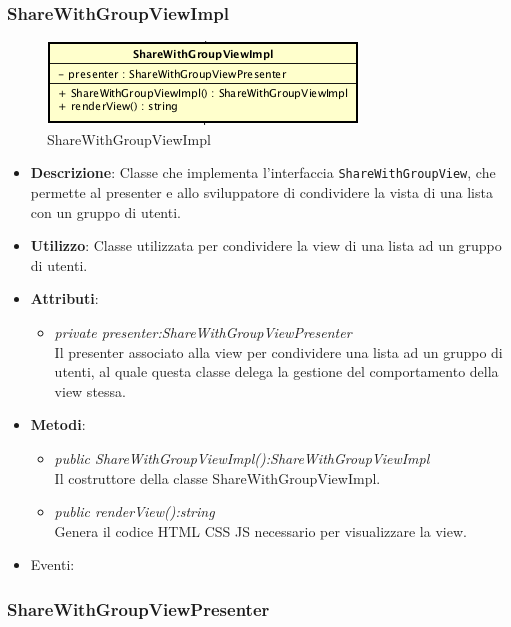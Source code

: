 \subsubsection{ShareWithGroupViewImpl}

\label{ShareWithGroupViewImpl}
\begin{figure}[ht]
	\centering
	\includegraphics[scale=0.5]{Sezioni/SottosezioniST/img/app/ShareWithGroupViewImpl.png}
	\caption{ShareWithGroupViewImpl}
\end{figure}

\begin{itemize}
\item \textbf{Descrizione}: Classe che implementa l'interfaccia \texttt{ShareWithGroupView}, che permette al presenter e allo sviluppatore di condividere la vista di una lista con un gruppo di utenti.
\item \textbf{Utilizzo}: Classe utilizzata per condividere la view di una lista ad un gruppo di utenti.
\item \textbf{Attributi}:
	\begin{itemize}
	\item \textit{private presenter:ShareWithGroupViewPresenter}\\
	Il presenter associato alla view per condividere una lista ad un gruppo di utenti, al quale questa classe delega la gestione del comportamento della view stessa.
	\end{itemize} 
\item \textbf{Metodi}:
	\begin{itemize}
	\item \textit{public ShareWithGroupViewImpl():ShareWithGroupViewImpl}\\
	Il costruttore della classe ShareWithGroupViewImpl.
	\item \textit{public renderView():string}\\
		Genera il codice HTML CSS JS necessario per visualizzare la view.
	\end{itemize}
\item{Eventi}:
\end{itemize}

\subsubsection{ShareWithGroupViewPresenter}

